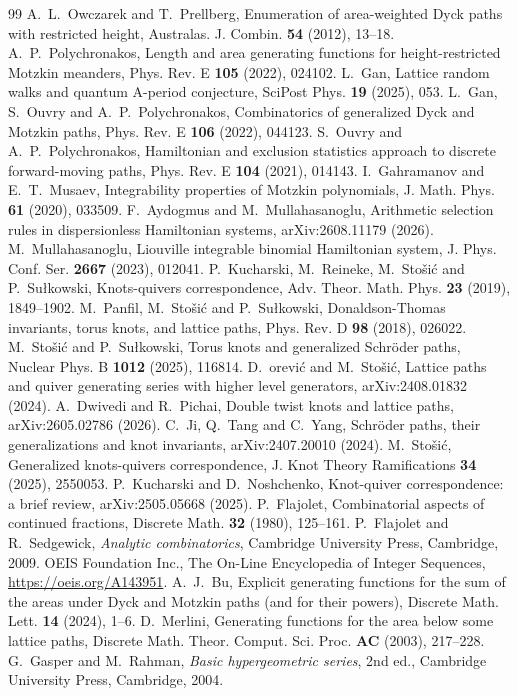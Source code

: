 \documentclass[11pt,reqno]{amsart}
\numberwithin{equation}{section}
\theoremstyle{remark}
\begin{document}
\begin{thebibliography}{99}
 A.~L.~Owczarek and T.~Prellberg, Enumeration of area-weighted Dyck paths with
  restricted height, Australas. J. Combin. \textbf{54} (2012), 13--18.
 A.~P.~Polychronakos, Length and area generating functions for
  height-restricted Motzkin meanders, Phys. Rev. E \textbf{105} (2022), 024102.
 L.~Gan, Lattice random walks and quantum A-period conjecture,
  SciPost Phys. \textbf{19} (2025), 053.
 L.~Gan, S.~Ouvry and A.~P.~Polychronakos, Combinatorics of generalized Dyck and
  Motzkin paths, Phys. Rev. E \textbf{106} (2022), 044123.
 S.~Ouvry and A.~P.~Polychronakos, Hamiltonian and exclusion statistics
  approach to discrete forward-moving paths, Phys. Rev. E \textbf{104} (2021), 014143.
 I.~Gahramanov and E.~T.~Musaev, Integrability properties of Motzkin
  polynomials, J. Math. Phys. \textbf{61} (2020), 033509.
 F.~Aydogmus and M.~Mullahasanoglu, Arithmetic selection rules in
  dispersionless Hamiltonian systems, arXiv:2608.11179 (2026).
 M.~Mullahasanoglu, Liouville integrable binomial Hamiltonian system,
  J. Phys. Conf. Ser. \textbf{2667} (2023), 012041.
 P.~Kucharski, M.~Reineke, M.~Sto\v si\'c and P.~Su\l kowski, Knots-quivers
  correspondence, Adv. Theor. Math. Phys. \textbf{23} (2019), 1849--1902.
 M.~Panfil, M.~Sto\v si\'c and P.~Su\l kowski, Donaldson-Thomas invariants,
  torus knots, and lattice paths, Phys. Rev. D \textbf{98} (2018), 026022.
 M.~Sto\v si\'c and P.~Su\l kowski, Torus knots and generalized Schr\"oder paths,
  Nuclear Phys. B \textbf{1012} (2025), 116814.
 D.~\DJ or\dj evi\'c and M.~Sto\v si\'c, Lattice paths and quiver generating
  series with higher level generators, arXiv:2408.01832 (2024).
 A.~Dwivedi and R.~Pichai, Double twist knots and lattice paths,
  arXiv:2605.02786 (2026).
 C.~Ji, Q.~Tang and C.~Yang, Schr\"oder paths, their generalizations and
  knot invariants, arXiv:2407.20010 (2024).
 M.~Sto\v si\'c, Generalized knots-quivers correspondence,
  J. Knot Theory Ramifications \textbf{34} (2025), 2550053.
 P.~Kucharski and D.~Noshchenko, Knot-quiver correspondence: a brief
  review, arXiv:2505.05668 (2025).
 P.~Flajolet, Combinatorial aspects of continued fractions,
  Discrete Math. \textbf{32} (1980), 125--161.
 P.~Flajolet and R.~Sedgewick, \emph{Analytic combinatorics}, Cambridge
  University Press, Cambridge, 2009.
 OEIS Foundation Inc., The On-Line Encyclopedia of Integer Sequences,
  \url{https://oeis.org/A143951}.
 A.~J.~Bu, Explicit generating functions for the sum of the areas under Dyck
  and Motzkin paths (and for their powers), Discrete Math. Lett. \textbf{14} (2024), 1--6.
 D.~Merlini, Generating functions for the area below some lattice paths,
  Discrete Math. Theor. Comput. Sci. Proc. \textbf{AC} (2003), 217--228.
 G.~Gasper and M.~Rahman, \emph{Basic hypergeometric series}, 2nd ed.,
  Cambridge University Press, Cambridge, 2004.
\end{thebibliography}
\end{document}

